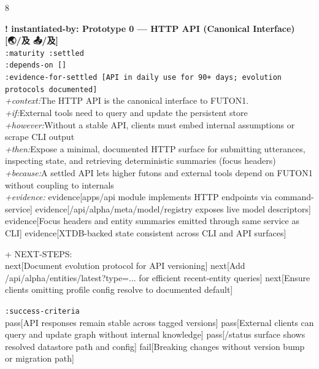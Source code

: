 \documentclass[landscape]{article}
\newcommand{\flexitag}[1]{\textcolor[gray]{0.35}{\textit{#1}}}
\newenvironment{devmapsettled}{%
  \def\FrameCommand{\colorbox{devmapsettledbg}}%
  \setlength{\fboxsep}{2pt}%
  \MakeFramed{\advance\hsize-\width \FrameRestore}%
}{\endMakeFramed}
\begin{document}
\begin{paracol}{8}
\par
\par
\begin{devmapsettled}
\textbf{! instantiated-by: Prototype 0 — HTTP API (Canonical Interface) [🌏/及 📤/及]}\\
  \texttt{:\allowbreak{}maturity :\allowbreak{}settled}\\
  \texttt{:\allowbreak{}depends-\allowbreak{}on []}\\
  \texttt{:\allowbreak{}evidence-\allowbreak{}for-\allowbreak{}settled [API in daily use for 90+\allowbreak{} days;\allowbreak{} evolution protocols documented]}\\
  \flexitag{+context:}The HTTP API is the canonical interface to FUTON1.\\
  \flexitag{+if:}External tools need to query and update the persistent store\\
  \flexitag{+however:}Without a stable API, clients must embed internal assumptions or scrape CLI output\\
  \flexitag{+then:}Expose a minimal, documented HTTP surface for submitting utterances, inspecting state, and retrieving deterministic summaries (focus headers)\\
  \flexitag{+because:}A settled API lets higher futons and external tools depend on FUTON1 without coupling to internals\\
  \flexitag{+evidence:} evidence[apps/api module implements HTTP endpoints via command-service] evidence[/api/alpha/meta/model/registry exposes live model descriptors] evidence[Focus headers and entity summaries emitted through same service as CLI] evidence[XTDB-backed state consistent across CLI and API surfaces]\\
\par
  + NEXT-STEPS:\\
    next[Document evolution protocol for API versioning] next[Add /api/alpha/entities/latest?type=... for efficient recent-entity queries] next[Ensure clients omitting profile config resolve to documented default]\\
\par
  \texttt{:\allowbreak{}success-\allowbreak{}criteria}\\
    pass[API responses remain stable across tagged versions] pass[External clients can query and update graph without internal knowledge] pass[/status surface shows resolved datastore path and config] fail[Breaking changes without version bump or migration path]\\
\par

\end{devmapsettled}
\end{paracol}
\end{document}
